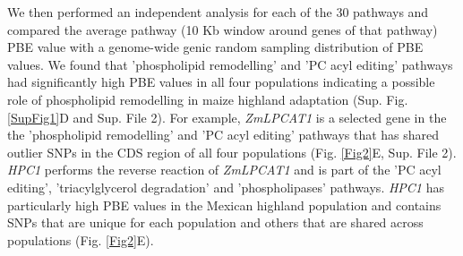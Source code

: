 \documentclass[9pt,twocolumn,twoside,lineno]{BioRxiv}
\begin{document}
We then performed an independent analysis for each of the 30 pathways and compared the average pathway (10 Kb window around genes of that pathway) PBE value with a genome-wide genic random sampling distribution of PBE values. 
We found that 'phospholipid remodelling'  and 'PC acyl editing'  pathways had significantly high PBE values in all four populations indicating a possible role of phospholipid remodelling in maize highland adaptation (Sup. Fig. \ref{SupFig1}D and Sup. File 2). 
For example, \textit{ZmLPCAT1} is a selected gene  in the the 'phospholipid remodelling' and 'PC acyl editing' pathways that has shared outlier SNPs in the CDS region of all four populations (Fig. \ref{Fig2}E, Sup. File 2). 
\textit{HPC1} performs the reverse reaction of \textit{ZmLPCAT1} and is part of the 'PC acyl editing', 'triacylglycerol degradation' and 'phospholipases' pathways. 
\textit{HPC1} has particularly high PBE values in the Mexican highland population and contains SNPs that are unique for each population and others that are shared across populations (Fig. \ref{Fig2}E). 
\end{document}
